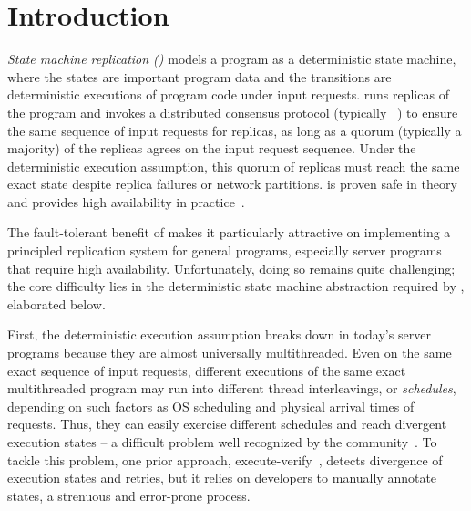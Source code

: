 \section{Introduction} \label{sec:intro}


\emph{State machine replication (\smr)} models a program as a deterministic 
state machine, where the states are important program data and the transitions 
are deterministic executions of program code under input requests.  \smr runs 
replicas of the program and invokes a distributed consensus protocol (typically 
\paxos~\cite{paxos,paxos:simple,paxos:complex}) to ensure the same sequence of 
input requests for replicas, as long as a quorum (typically a majority) of the 
replicas agrees on the input request sequence. Under the deterministic execution 
assumption, this quorum of replicas must reach the same exact state despite 
replica failures or network partitions.  \smr is proven safe in 
theory and provides high availability in 
practice~\cite{paxos:live,paxos:practical,chubby:osdi,paxos:datastore, 
bolosky:nsdi11,mencius:osdi08,eve:osdi12,rex:eurosys14}.



The fault-tolerant benefit of \smr makes it particularly attractive on 
implementing a principled replication system for general programs, especially 
server programs that require high availability.  Unfortunately, doing so remains
quite challenging; the core difficulty lies in the deterministic state
machine abstraction required by \smr, elaborated below.

First, the deterministic execution assumption breaks down in today's
server programs because they are almost universally multithreaded. Even on the 
same exact sequence of input requests, different executions of the same exact 
multithreaded program may run into different thread interleavings, or 
\emph{schedules}, depending on such factors as OS scheduling and physical 
arrival times of requests. Thus, they can easily exercise different schedules 
and reach divergent execution states -- a difficult problem well recognized by 
the community~\cite{dos:osdi10,eve:osdi12,ddos:asplos13,rex:eurosys14}.
To tackle this problem, one prior approach,
execute-verify~\cite{eve:osdi12}, detects divergence of execution states
and retries, but it relies on developers to manually annotate states, a
strenuous and error-prone process.

